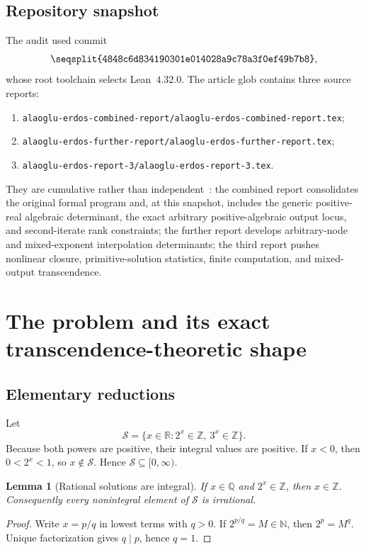 \documentclass[11pt,oneside]{article}
\newtheorem{lemma}[theorem]{Lemma}
\theoremstyle{definition}
\theoremstyle{remark}
\newcommand{\N}{\mathbb N}
\newcommand{\Z}{\mathbb Z}
\newcommand{\Q}{\mathbb Q}
\newcommand{\R}{\mathbb R}
\newcommand{\Sol}{\mathcal S}
\newcommand{\sha}[1]{\texttt{\seqsplit{#1}}}
\begin{document}
\subsection{Repository snapshot}

The audit used commit
\[
\sha{4848c6d834190301e014028a9c78a3f0ef49b7b8},
\]
whose root toolchain selects Lean~$4.32.0$.  The article glob contains three source reports:

\begin{enumerate}
\item \texttt{alaoglu-erdos-combined-report/alaoglu-erdos-combined-report.tex};
\item \texttt{alaoglu-erdos-further-report/alaoglu-erdos-further-report.tex};
\item \texttt{alaoglu-erdos-report-3/alaoglu-erdos-report-3.tex}.
\end{enumerate}

They are cumulative rather than independent~\cite{ProveItCombined,ProveItFurther,ProveItReport3}: the combined report consolidates the original
formal program and, at this snapshot, includes the generic positive-real algebraic
determinant, the exact arbitrary positive-algebraic output locus, and second-iterate rank
constraints; the further report develops arbitrary-node and mixed-exponent interpolation
determinants; the third report pushes nonlinear closure, primitive-solution statistics,
finite computation, and mixed-output transcendence.

\section{The problem and its exact transcendence-theoretic shape}

\subsection{Elementary reductions}

Let
\[
 \Sol=\{x\in\R:2^x\in\Z,\ 3^x\in\Z\}.
\]
Because both powers are positive, their integral values are positive.  If $x<0$, then
$0<2^x<1$, so $x\notin\Sol$.  Hence $\Sol\subseteq[0,\infty)$.

\begin{lemma}[Rational solutions are integral]\label{lem:rational-integral}
If $x\in\Q$ and $2^x\in\Z$, then $x\in\Z$.  Consequently every nonintegral element of
$\Sol$ is irrational.
\end{lemma}

\begin{proof}
Write $x=p/q$ in lowest terms with $q>0$.  If $2^{p/q}=M\in\N$, then $2^p=M^q$.
Unique factorization gives $q\mid p$, hence $q=1$.
\end{proof}
\end{document}
